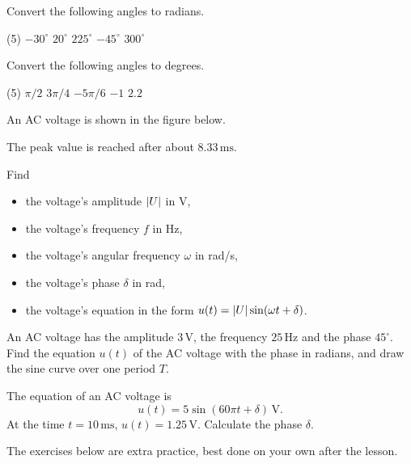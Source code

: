 
Convert the following angles to radians.
\begin{delar}(5)
  \task $-30^{\circ}$
  \task $20^{\circ}$
  \task $225^{\circ}$
  \task $-45^{\circ}$
  \task $300^{\circ}$
\end{delar}

Convert the following angles to degrees.
\begin{delar}(5)
  \task $\pi/2$
  \task $3\pi/4$
  \task $-5\pi/6$
  \task $-1$
  \task $2.2$
\end{delar}

An AC voltage is shown in the figure below.


\begin{aside}
\note[Note] The peak value is reached after about $8.33\,\text{ms}$.
\end{aside}

\noindent Find
\begin{itemize}
  \item the voltage's amplitude $\lvert U\rvert$ in V,
  \item the voltage's frequency $f$ in Hz,
  \item the voltage's angular frequency $\omega$ in rad/s,
  \item the voltage's phase $\delta$ in rad,
  \item the voltage's equation in the form $u(t) = \lvert U\rvert\sin(\omega t + \delta)$.
\end{itemize}

An AC voltage has the amplitude $3\,\text{V}$, the frequency $25\,\text{Hz}$ and the phase
$45^{\circ}$. Find the equation $u(t)$ of the AC voltage with the phase in radians, and draw the
sine curve over one period $T$.

The equation of an AC voltage is
\[
  u(t) = 5\sin(60\pi t + \delta)\,\text{V}.
\]
At the time $t = 10\,\text{ms}$, $u(t) = 1.25\,\text{V}$. Calculate the phase $\delta$.

The exercises below are extra practice, best done on your own after the lesson.

